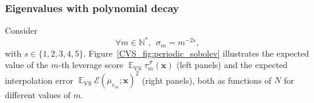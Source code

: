 \documentclass[twoside,11pt]{book}
\numberwithin{theorem}{chapter}
\numberwithin{definition}{chapter}
\numberwithin{proposition}{chapter}
\numberwithin{corollary}{chapter}
\numberwithin{example}{chapter}
\numberwithin{lemma}{chapter}
\numberwithin{assumption}{chapter}
\numberwithin{equation}{chapter}
\numberwithin{figure}{chapter}
\DeclareMathOperator{\VS}{\mathrm{VS}}
\DeclareMathOperator{\EX}{\mathbb{E}}
\DeclareMathOperator{\F}{\mathcal{F}}
\begin{document}
\subsubsection{Eigenvalues with polynomial decay}
Consider
\begin{equation}
\forall m \in \mathbb{N}^{*}, \:\: \sigma_{m}=m^{-2s},
\end{equation}
with $s \in \{1,2,3,4,5\}$.
Figure~\ref{CVS_fig:periodic_sobolev} illustrates the expected value of the $m$-th leverage score $\EX_{\VS} \tau_{m}^{\F}(\bm{x})$ (left panels) and the expected interpolation error $\EX_{\VS} \mathcal{E}(\mu_{e_{m}};\bm{x})^{2}$ (right panels), both as functions of $N$ for different values of $m$.

 
\end{document}
